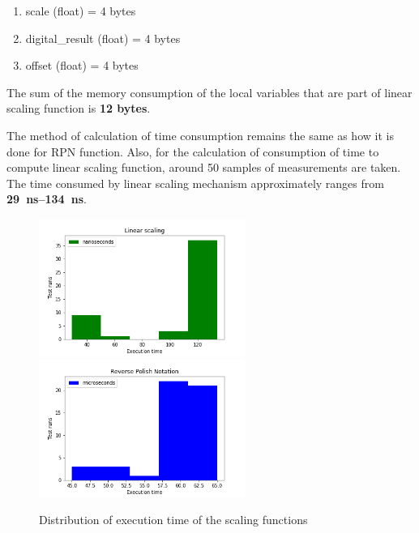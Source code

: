 \begin{enumerate}
\item scale (float) = 4 bytes
\item digital\_result (float) = 4 bytes
\item offset (float) = 4 bytes 
\end{enumerate}                         
The sum of the memory consumption of the local variables that are part of linear scaling function is \textbf{12 bytes}.

The method of calculation of time consumption remains the same as how it is done for RPN function. Also, for the calculation of consumption of time to compute linear scaling function, around 50 samples of measurements are taken. The time consumed by linear scaling mechanism approximately ranges from \textbf{\SIrange{29}{134}{\nano\second}}.

\begin{figure}[hbt]
		\centering
		\includegraphics[width=0.6\textwidth]{images/linear_scaling.png}
		\includegraphics[width=0.6\textwidth]{images/rpn.png}
		\caption{Distribution of execution time of the scaling functions}
		\label{fig:Histogram}
\end{figure}

